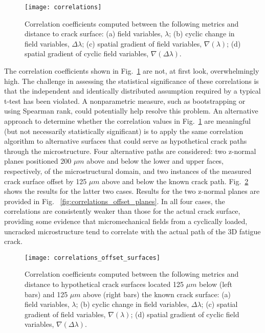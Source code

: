 \begin{figure}[p]
  \centering
    \texttt{[image: correlations]}
    \caption{Correlation coefficients computed between the following metrics and distance to crack surface: (a) field variables, $\lambda$; (b) cyclic change in field variables, $\Delta\lambda$; (c) spatial gradient of field variables, $\nabla(\lambda)$; (d) spatial gradient of cyclic field variables, $\nabla(\Delta\lambda)$.}
    \label{fig:correlations}
\end{figure}

The correlation coefficients shown in Fig.~\ref{fig:correlations} are not, at first look, overwhelmingly high. The challenge in assessing the statistical significance of these correlations is that the independent and identically distributed assumption required by a typical t-test has been violated. A nonparametric measure, such as bootstrapping \cite{good2010} or using Spearman rank, could potentially help resolve this problem. An alternative approach to determine whether the correlation values in Fig.~\ref{fig:correlations} are meaningful (but not necessarily statistically significant) is to apply the same correlation algorithm to alternative surfaces that could serve as hypothetical crack paths through the microstructure. Four alternative paths are considered: two z-normal planes positioned 200 $\mu m$ above and below the lower and upper faces, respectively, of the microstructural domain, and two instances of the measured crack surface offset by 125 $\mu m$ above and below the known crack path. Fig.~\ref{fig:correlations_offset_surfaces} shows the results for the latter two cases. Results for the two z-normal planes are provided in Fig. ~\ref{fig:correlations_offset_planes}. In all four cases, the correlations are consistently weaker than those for the actual crack surface, providing some evidence that micromechanical fields from a cyclically loaded, uncracked microstructure tend to correlate with the actual path of the 3D fatigue crack.

\begin{figure}[p]
  \centering
    \texttt{[image: correlations\_offset\_surfaces]}
    \caption{Correlation coefficients computed between the following metrics and distance to hypothetical crack surfaces located 125 $\mu m$ below (left bars) and 125 $\mu m$ above (right bars) the known crack surface: (a) field variables, $\lambda$; (b) cyclic change in field variables, $\Delta\lambda$; (c) spatial gradient of field variables, $\nabla(\lambda)$; (d) spatial gradient of cyclic field variables, $\nabla(\Delta\lambda)$.}
    \label{fig:correlations_offset_surfaces}
\end{figure}

